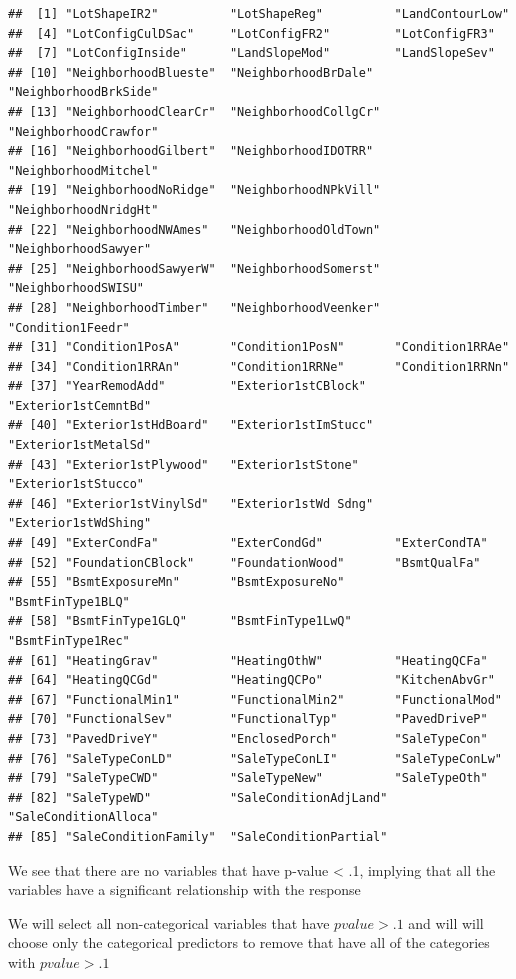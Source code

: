 \documentclass[
]{article}
\begin{document}
\begin{verbatim}
##  [1] "LotShapeIR2"          "LotShapeReg"          "LandContourLow"      
##  [4] "LotConfigCulDSac"     "LotConfigFR2"         "LotConfigFR3"        
##  [7] "LotConfigInside"      "LandSlopeMod"         "LandSlopeSev"        
## [10] "NeighborhoodBlueste"  "NeighborhoodBrDale"   "NeighborhoodBrkSide" 
## [13] "NeighborhoodClearCr"  "NeighborhoodCollgCr"  "NeighborhoodCrawfor" 
## [16] "NeighborhoodGilbert"  "NeighborhoodIDOTRR"   "NeighborhoodMitchel" 
## [19] "NeighborhoodNoRidge"  "NeighborhoodNPkVill"  "NeighborhoodNridgHt" 
## [22] "NeighborhoodNWAmes"   "NeighborhoodOldTown"  "NeighborhoodSawyer"  
## [25] "NeighborhoodSawyerW"  "NeighborhoodSomerst"  "NeighborhoodSWISU"   
## [28] "NeighborhoodTimber"   "NeighborhoodVeenker"  "Condition1Feedr"     
## [31] "Condition1PosA"       "Condition1PosN"       "Condition1RRAe"      
## [34] "Condition1RRAn"       "Condition1RRNe"       "Condition1RRNn"      
## [37] "YearRemodAdd"         "Exterior1stCBlock"    "Exterior1stCemntBd"  
## [40] "Exterior1stHdBoard"   "Exterior1stImStucc"   "Exterior1stMetalSd"  
## [43] "Exterior1stPlywood"   "Exterior1stStone"     "Exterior1stStucco"   
## [46] "Exterior1stVinylSd"   "Exterior1stWd Sdng"   "Exterior1stWdShing"  
## [49] "ExterCondFa"          "ExterCondGd"          "ExterCondTA"         
## [52] "FoundationCBlock"     "FoundationWood"       "BsmtQualFa"          
## [55] "BsmtExposureMn"       "BsmtExposureNo"       "BsmtFinType1BLQ"     
## [58] "BsmtFinType1GLQ"      "BsmtFinType1LwQ"      "BsmtFinType1Rec"     
## [61] "HeatingGrav"          "HeatingOthW"          "HeatingQCFa"         
## [64] "HeatingQCGd"          "HeatingQCPo"          "KitchenAbvGr"        
## [67] "FunctionalMin1"       "FunctionalMin2"       "FunctionalMod"       
## [70] "FunctionalSev"        "FunctionalTyp"        "PavedDriveP"         
## [73] "PavedDriveY"          "EnclosedPorch"        "SaleTypeCon"         
## [76] "SaleTypeConLD"        "SaleTypeConLI"        "SaleTypeConLw"       
## [79] "SaleTypeCWD"          "SaleTypeNew"          "SaleTypeOth"         
## [82] "SaleTypeWD"           "SaleConditionAdjLand" "SaleConditionAlloca" 
## [85] "SaleConditionFamily"  "SaleConditionPartial"
\end{verbatim}

We see that there are no variables that have p-value \textless{} .1, implying that all the variables have a significant relationship with the response

We will select all non-categorical variables that have \(pvalue>.1\) and will will choose only the categorical predictors to remove that have all of the categories with \(pvalue>.1\)
\end{document}

